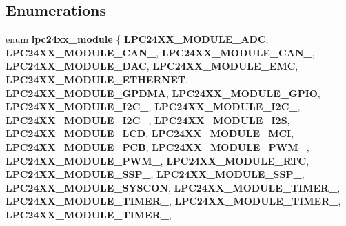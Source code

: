 \subsection*{Enumerations}
\begin{DoxyCompactItemize}
\item 
\mbox{\label{group__lpc24xx__io_ga3008c6fbedfd96cd85083a1b8eb28f62}} 
enum {\bfseries lpc24xx\+\_\+module} \{ \newline
{\bfseries L\+P\+C24\+X\+X\+\_\+\+M\+O\+D\+U\+L\+E\+\_\+\+A\+DC}, 
{\bfseries L\+P\+C24\+X\+X\+\_\+\+M\+O\+D\+U\+L\+E\+\_\+\+C\+A\+N\+\_}, 
{\bfseries L\+P\+C24\+X\+X\+\_\+\+M\+O\+D\+U\+L\+E\+\_\+\+C\+A\+N\+\_}, 
{\bfseries L\+P\+C24\+X\+X\+\_\+\+M\+O\+D\+U\+L\+E\+\_\+\+D\+AC}, 
\newline
{\bfseries L\+P\+C24\+X\+X\+\_\+\+M\+O\+D\+U\+L\+E\+\_\+\+E\+MC}, 
{\bfseries L\+P\+C24\+X\+X\+\_\+\+M\+O\+D\+U\+L\+E\+\_\+\+E\+T\+H\+E\+R\+N\+ET}, 
{\bfseries L\+P\+C24\+X\+X\+\_\+\+M\+O\+D\+U\+L\+E\+\_\+\+G\+P\+D\+MA}, 
{\bfseries L\+P\+C24\+X\+X\+\_\+\+M\+O\+D\+U\+L\+E\+\_\+\+G\+P\+IO}, 
\newline
{\bfseries L\+P\+C24\+X\+X\+\_\+\+M\+O\+D\+U\+L\+E\+\_\+\+I2\+C\+\_}, 
{\bfseries L\+P\+C24\+X\+X\+\_\+\+M\+O\+D\+U\+L\+E\+\_\+\+I2\+C\+\_}, 
{\bfseries L\+P\+C24\+X\+X\+\_\+\+M\+O\+D\+U\+L\+E\+\_\+\+I2\+C\+\_}, 
{\bfseries L\+P\+C24\+X\+X\+\_\+\+M\+O\+D\+U\+L\+E\+\_\+\+I2S}, 
\newline
{\bfseries L\+P\+C24\+X\+X\+\_\+\+M\+O\+D\+U\+L\+E\+\_\+\+L\+CD}, 
{\bfseries L\+P\+C24\+X\+X\+\_\+\+M\+O\+D\+U\+L\+E\+\_\+\+M\+CI}, 
{\bfseries L\+P\+C24\+X\+X\+\_\+\+M\+O\+D\+U\+L\+E\+\_\+\+P\+CB}, 
{\bfseries L\+P\+C24\+X\+X\+\_\+\+M\+O\+D\+U\+L\+E\+\_\+\+P\+W\+M\+\_}, 
\newline
{\bfseries L\+P\+C24\+X\+X\+\_\+\+M\+O\+D\+U\+L\+E\+\_\+\+P\+W\+M\+\_}, 
{\bfseries L\+P\+C24\+X\+X\+\_\+\+M\+O\+D\+U\+L\+E\+\_\+\+R\+TC}, 
{\bfseries L\+P\+C24\+X\+X\+\_\+\+M\+O\+D\+U\+L\+E\+\_\+\+S\+S\+P\+\_}, 
{\bfseries L\+P\+C24\+X\+X\+\_\+\+M\+O\+D\+U\+L\+E\+\_\+\+S\+S\+P\+\_}, 
\newline
{\bfseries L\+P\+C24\+X\+X\+\_\+\+M\+O\+D\+U\+L\+E\+\_\+\+S\+Y\+S\+C\+ON}, 
{\bfseries L\+P\+C24\+X\+X\+\_\+\+M\+O\+D\+U\+L\+E\+\_\+\+T\+I\+M\+E\+R\+\_}, 
{\bfseries L\+P\+C24\+X\+X\+\_\+\+M\+O\+D\+U\+L\+E\+\_\+\+T\+I\+M\+E\+R\+\_}, 
{\bfseries L\+P\+C24\+X\+X\+\_\+\+M\+O\+D\+U\+L\+E\+\_\+\+T\+I\+M\+E\+R\+\_}, 
\newline
{\bfseries L\+P\+C24\+X\+X\+\_\+\+M\+O\+D\+U\+L\+E\+\_\+\+T\+I\+M\+E\+R\+\_}, 

\end{DoxyCompactItemize}
